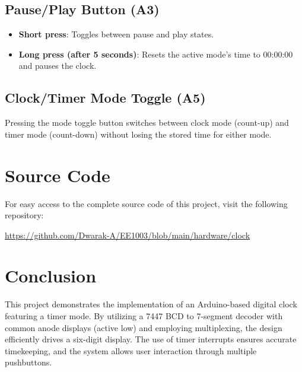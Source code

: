 \documentclass[a4paper,12pt]{article}
\begin{document}
\subsection{Pause/Play Button (A3)}
\begin{itemize}
    \item \textbf{Short press}: Toggles between pause and play states.
    \item \textbf{Long press (after 5 seconds)}: Resets the active mode's time to 00:00:00 and pauses the clock.
\end{itemize}

\subsection{Clock/Timer Mode Toggle (A5)}
Pressing the mode toggle button switches between clock mode (count-up) and timer mode (count-down) without losing the stored time for either mode.

\section{Source Code}
For easy access to the complete source code of this project, visit the following repository:
\begin{center}
    \url{https://github.com/Dwarak-A/EE1003/blob/main/hardware/clock}
\end{center}

\section{Conclusion}
This project demonstrates the implementation of an Arduino-based digital clock featuring a timer mode. By utilizing a 7447 BCD to 7-segment decoder with common anode displays (active low) and employing multiplexing, the design efficiently drives a six-digit display. The use of timer interrupts ensures accurate timekeeping, and the system allows user interaction through multiple pushbuttons.
\end{document}
